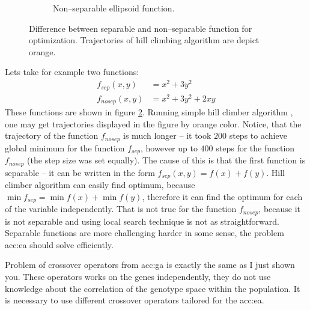 \begin{figure}
\begin{subfigure}[t]{0.49\textwidth}
        \caption{Non--separable ellipsoid function.}
        \label{fig:nonseparableelipsoid}
    \end{subfigure}
    \caption[Difference between separable and non--separable function for optimization]{Difference between separable and non--separable function for optimization. Trajectories of hill climbing algorithm are depict orange.}
    \label{fig:separationfucntions}
\end{figure}

Lets take for example two functions:
\begin{align*}
    f_{sep}(x,y)&=x^2+3y^2 \\
    f_{nosep}(x,y)&=x^2+3y^2+2xy
\end{align*}
These functions are shown in figure \ref{fig:separationfucntions}. Running simple hill climber algorithm \citep{HandbookOfMetaheuristics}, one may get trajectories displayed in the figure by orange color. Notice, that the trajectory of the function $f_{nosep}$ is much longer -- it took $200$ steps to achieve global minimum for the function $f_{sep}$, however up to $400$ steps for the function $f_{nosep}$ (the step size was set equally). The cause of this is that the first function is separable -- it can be written in the form $f_{sep}(x,y)=f(x)+f(y)$. Hill climber algorithm can easily find optimum, because $\min f_{sep}=\min f(x)+\min f(y)$, therefore it can find the optimum for each of the variable independently. That is not true for the function $f_{nosep}$, because it is not separable and using local search technique is not as straightforward. Separable functions are more challenging harder in some sense, the problem \acrshort{acc:ea} should solve efficiently.

Problem of crossover operators from \acrshort{acc:ga} is exactly the same as I just shown you. These operators works on the genes independently, they do not use knowledge about the correlation of the genotype space within the population. It is necessary to use different crossover operators tailored for the \acrshort{acc:ea}.

